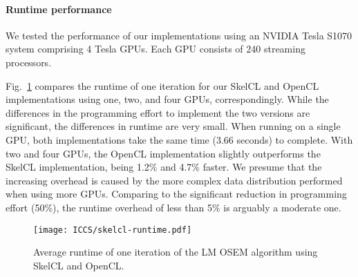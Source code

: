 \paragraph{Runtime performance}
We tested the performance of our implementations using an NVIDIA Tesla S1070 system comprising 4 Tesla GPUs.
Each GPU consists of 240 streaming processors.

Fig.~\ref{fig:lmosem_runtime} compares the runtime of one iteration for our SkelCL and OpenCL implementations using one, two, and four GPUs, correspondingly.
While the differences in the programming effort to implement the two versions are significant, the differences in runtime are very small.
When running on a single GPU, both implementations take the same time (3.66 seconds) to complete.
With two and four GPUs, the OpenCL implementation slightly outperforms the SkelCL implementation, being 1.2\% and 4.7\% faster.
We presume that the increasing overhead is caused by the more complex data distribution performed when using more GPUs.
Comparing to the significant reduction in programming effort (50\%), the runtime overhead of less than 5\% is arguably a moderate one.
\vfill
\begin{figure}
  \centering
  \texttt{[image: ICCS/skelcl-runtime.pdf]}
  \caption{Average runtime of one iteration of the LM OSEM algorithm using SkelCL and OpenCL.}
  \label{fig:lmosem_runtime}
\end{figure}

